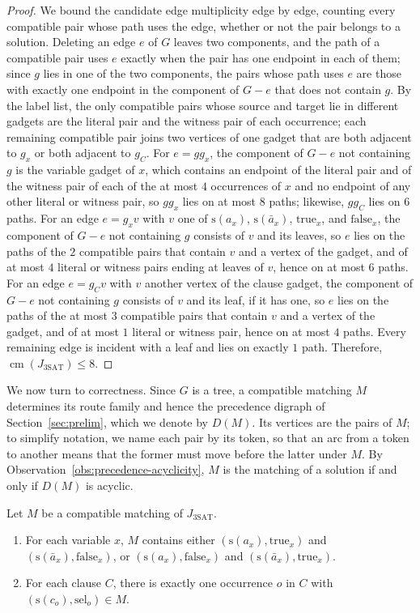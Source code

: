 \documentclass[a4paper,USenglish,thm-restate]{lipics-v2021}
\newcommand{\cm}{\operatorname{cm}}
\newcommand{\src}{\mathrm{s}}
\theoremstyle{problemstyle}
\begin{document}
\begin{proof}
We bound the candidate edge multiplicity edge by edge, counting every
compatible pair whose path uses the edge, whether or not the pair belongs
to a solution. Deleting an edge $e$ of $G$ leaves two components, and the
path of a compatible pair uses $e$ exactly when the pair has one endpoint
in each of them; since $g$ lies in one of the two components, the pairs
whose path uses $e$ are those with exactly one endpoint in the component
of $G-e$ that does not contain $g$. By the label list, the only compatible
pairs whose source and target lie in different gadgets are the literal
pair and the witness pair of each occurrence; each remaining compatible
pair joins two vertices of one gadget that are both adjacent to $g_x$ or
both adjacent to $g_C$. For $e=gg_x$, the component of $G-e$ not
containing $g$ is the variable gadget of $x$, which contains an endpoint
of the literal pair and of the witness pair of each of the at most $4$
occurrences of $x$ and no endpoint of any other literal or witness pair,
so $gg_x$ lies on at most $8$ paths; likewise, $gg_C$ lies on $6$ paths.
For an edge $e=g_xv$ with $v$ one of $\src(a_x)$, $\src(\bar{a}_x)$,
$\mathrm{true}_x$, and $\mathrm{false}_x$, the component of $G-e$ not
containing $g$ consists of $v$ and its leaves, so $e$ lies on the paths of
the $2$ compatible pairs that contain $v$ and a vertex of the gadget, and
of at most $4$ literal or witness pairs ending at leaves of $v$, hence on
at most $6$ paths. For an edge $e=g_Cv$ with $v$ another vertex of the
clause gadget, the component of $G-e$ not containing $g$ consists of $v$
and its leaf, if it has one, so $e$ lies on the paths of the at most $3$
compatible pairs that contain $v$ and a vertex of the gadget, and of at
most $1$ literal or witness pair, hence on at most $4$ paths. Every
remaining edge is incident with a leaf and lies on exactly $1$ path.
Therefore, $\cm(J_{\mathrm{3SAT}})\le 8$.
\end{proof}

We now turn to correctness. Since $G$ is a tree, a compatible matching $M$
determines its route family and hence the precedence digraph of
Section~\ref{sec:prelim}, which we denote by $D(M)$. Its vertices are the
pairs of $M$; to simplify notation, we name each pair by its token, so
that an arc from a token to another means that the former must move
before the latter under $M$. By Observation~\ref{obs:precedence-acyclicity},
$M$ is the matching of a solution if and only if $D(M)$ is acyclic.

\begin{lemma}\label{lem:cm-matching-structure}
Let $M$ be a compatible matching of $J_{\mathrm{3SAT}}$.
\begin{enumerate}
\item For each variable $x$, $M$ contains either
$(\src(a_x),\mathrm{true}_x)$ and $(\src(\bar a_x),\mathrm{false}_x)$, or
$(\src(a_x),\mathrm{false}_x)$ and $(\src(\bar a_x),\mathrm{true}_x)$.
\item For each clause $C$, there is exactly one occurrence $o$ in $C$ with
$(\src(c_o),\mathrm{sel}_o)\in M$.
\end{enumerate}
\end{lemma}
\end{document}
